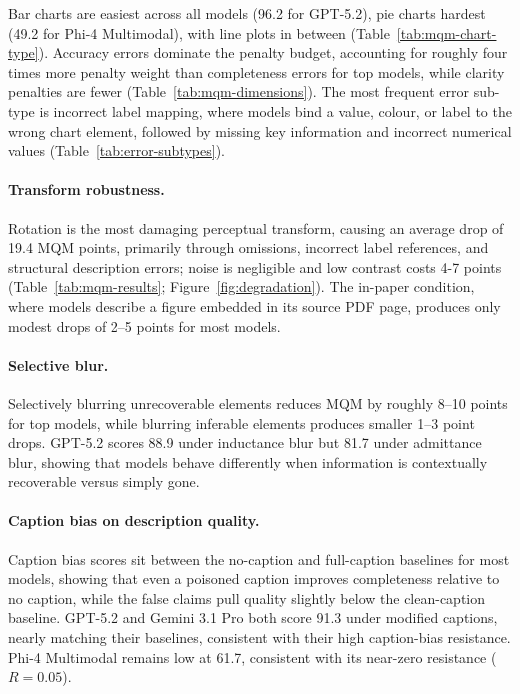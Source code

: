 Bar charts are easiest across all models (96.2 for GPT-5.2), pie charts hardest (49.2 for Phi-4 Multimodal), with line plots in between (Table~\ref{tab:mqm-chart-type}). Accuracy errors dominate the penalty budget, accounting for roughly four times more penalty weight than completeness errors for top models, while clarity penalties are fewer (Table~\ref{tab:mqm-dimensions}). The most frequent error sub-type is incorrect label mapping, where models bind a value, colour, or label to the wrong chart element, followed by missing key information and incorrect numerical values (Table~\ref{tab:error-subtypes}).

\paragraph{Transform robustness.}
Rotation is the most damaging perceptual transform, causing an average drop of 19.4 MQM points, primarily through omissions, incorrect label references, and structural description errors; noise is negligible and low contrast costs 4-7 points (Table~\ref{tab:mqm-results}; Figure~\ref{fig:degradation}). The in-paper condition, where models describe a figure embedded in its source PDF page, produces only modest drops of 2--5 points for most models.

\paragraph{Selective blur.}
Selectively blurring unrecoverable elements reduces MQM by roughly 8--10 points for top models, while blurring inferable elements produces smaller 1--3 point drops. GPT-5.2 scores 88.9 under inductance blur but 81.7 under admittance blur, showing that models behave differently when information is contextually recoverable versus simply gone.

\paragraph{Caption bias on description quality.}
Caption bias scores sit between the no-caption and full-caption baselines for most models, showing that even a poisoned caption improves completeness relative to no caption, while the false claims pull quality slightly below the clean-caption baseline. GPT-5.2 and Gemini 3.1 Pro both score 91.3 under modified captions, nearly matching their baselines, consistent with their high caption-bias resistance. Phi-4 Multimodal remains low at 61.7, consistent with its near-zero resistance ($R = 0.05$).


